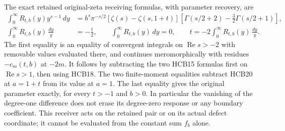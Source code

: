 The exact retained original-zeta receiving formulas, with parameter
recovery, are
\begin{equation}\tag{HCB33}
\begin{split}
 \int_0^\infty R_{t,b}(y)y^{s-1}\,dy
  &=b^s\pi^{-s/2}[\zeta(s)-\zeta(s,1+t)]
       \left[\Gamma(s/2+2)-\frac32\Gamma(s/2+1)\right],\\
 \int_0^\infty R_{t,b}(y)\,\frac{dy}{y}&=-\frac t2,
 \qquad \int_0^\infty R_{t,b}(y)\,dy=0,\qquad
 t=-2\int_0^\infty R_{t,b}(y)\,\frac{dy}{y}.
\end{split}
\end{equation}
The first equality is an equality of convergent integrals on
$\operatorname{Re}s>-2$ with removable values evaluated there, and
continues meromorphically with residues $-c_m(t,b)$ at $-2m$.
It follows by subtracting the two HCB15 formulas first on
$\operatorname{Re}s>1$, then using HCB18. The two finite-moment
equalities subtract HCB20 at $a=1+t$ from its value at $a=1$.
The last equality gives the original parameter exactly, for every
$t>-1$ and $b>0$. In particular the vanishing of the degree-one
difference does not erase its degree-zero response or any boundary
coefficient. This receiver acts on the retained pair or on its
actual defect coordinate; it cannot be evaluated from the constant
sum $f_b$ alone.
